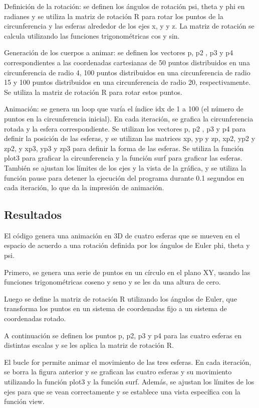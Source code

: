 \documentclass[12pt]{article}
\begin{document}
	Definición de la rotación: se definen los ángulos de rotación psi, theta y phi en radianes y se utiliza la matriz de rotación R para rotar los puntos de la circunferencia y las esferas alrededor de los ejes x, y y z. La matriz de rotación se calcula utilizando las funciones trigonométricas cos y sin.
	
	Generación de los cuerpos a animar: se definen los vectores p, p2 , p3 y p4 correspondientes a las coordenadas cartesianas de 50 puntos distribuidos en una circunferencia de radio 4, 100 puntos distribuidos en una circunferencia de radio 15 y 100 puntos distribuidos en una circunferencia de radio 20, respectivamente. Se utiliza la matriz de rotación R para rotar estos puntos.
	
	Animación: se genera un loop que varía el índice idx de 1 a 100 (el número de puntos en la circunferencia inicial). En cada iteración, se grafica la circunferencia rotada y la esfera correspondiente. Se utilizan los vectores p, p2 , p3 y p4 para definir la posición de las esferas, y se utilizan las matrices xp, yp y zp, xp2, yp2 y zp2, y xp3, yp3 y zp3 para definir la forma de las esferas. Se utiliza la función plot3 para graficar la circunferencia y la función surf para graficar las esferas. También se ajustan los límites de los ejes y la vista de la gráfica, y se utiliza la función pause para detener la ejecución del programa durante 0.1 segundos en cada iteración, lo que da la impresión de animación.
	
	\subsection{Resultados}
	El código genera una animación en 3D de cuatro esferas que se mueven en el espacio de acuerdo a una rotación definida por los ángulos de Euler phi, theta y psi.
	
	Primero, se genera una serie de puntos en un círculo en el plano XY, usando las funciones trigonométricas coseno y seno y se les da una altura de cero.
	
	Luego se define la matriz de rotación R utilizando los ángulos de Euler, que transforma los puntos en un sistema de coordenadas fijo a un sistema de coordenadas rotado.
	
	A continuación se definen los puntos p, p2, p3 y p4 para las cuatro esferas en distintas escalas y se les aplica la matriz de rotación R.
	
	El bucle for permite animar el movimiento de las tres esferas. En cada iteración, se borra la figura anterior y se grafican las cuatro esferas y su movimiento utilizando la función plot3 y la función surf. Además, se ajustan los límites de los ejes para que se vean correctamente y se establece una vista específica con la función view.
	
\end{document}
